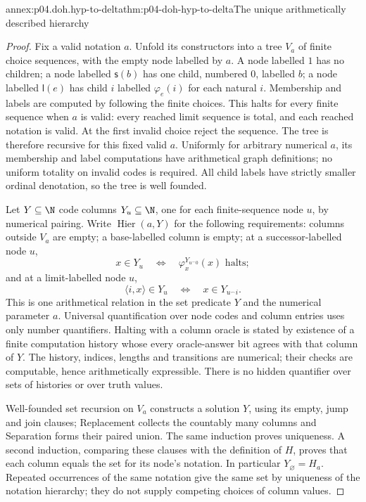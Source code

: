 \begin{annexitem}{annex:p04.doh.hyp-to-delta}{thm:p04-doh-hyp-to-delta}{The unique arithmetically described hierarchy}
\begin{proof}
Fix a valid notation \(a\). Unfold its constructors into a tree
\(V_a\) of finite choice sequences, with the empty node labelled
by \(a\). A node labelled \(1\) has no children; a node labelled
\(\mathsf s(b)\) has one child, numbered \(0\), labelled \(b\);
a node labelled \(\mathsf l(e)\) has child \(i\) labelled
\(\varphi_e(i)\) for each natural \(i\). Membership and labels
are computed by following the finite choices. This halts for every
finite sequence when \(a\) is valid: every reached limit sequence
is total, and each reached notation is valid. At the first invalid
choice reject the sequence. The tree is therefore recursive for
this fixed valid \(a\). Uniformly for arbitrary numerical \(a\),
its membership and label computations have arithmetical graph
definitions; no uniform totality on invalid codes is required.
All child labels have strictly smaller ordinal denotation, so the
tree is well founded.

Let \(Y\subseteq\N\) code columns \(Y_u\subseteq\N\), one for
each finite-sequence node \(u\), by numerical pairing. Write
\(\operatorname{Hier}(a,Y)\) for the following requirements:
columns outside \(V_a\) are empty; a base-labelled column is empty;
at a successor-labelled node \(u\),
\[
 x\in Y_u\quad\Longleftrightarrow\quad
 \varphi_x^{Y_{u^\frown0}}(x)\text{ halts};
\]
and at a limit-labelled node \(u\),
\[
 \langle i,x\rangle\in Y_u\quad\Longleftrightarrow\quad
 x\in Y_{u^\frown i}.
\]
This is one arithmetical relation in the set predicate \(Y\) and
the numerical parameter \(a\). Universal quantification over node
codes and column entries uses only number quantifiers. Halting with
a column oracle is stated by existence of a finite computation
history whose every oracle-answer bit agrees with that column of
\(Y\). The history, indices, lengths and transitions are numerical;
their checks are computable, hence arithmetically expressible. There
is no hidden quantifier over sets of histories or over truth values.

Well-founded set recursion on \(V_a\) constructs a solution \(Y\),
using its empty, jump and join clauses; Replacement collects the
countably many columns and Separation forms their paired union.
The same induction proves uniqueness. A second induction, comparing
these clauses with the definition of \(H\), proves that each
column equals the set for its node's notation. In particular
\(Y_{\varnothing}=H_a\). Repeated occurrences of the same notation
give the same set by uniqueness of the notation hierarchy; they do
not supply competing choices of column values.


\end{proof}
\end{annexitem}
